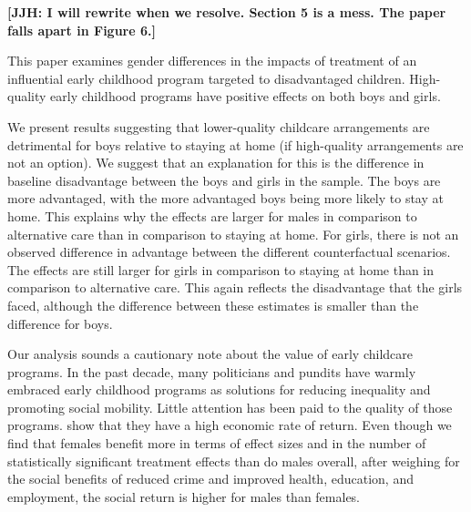 \textbf{[JJH: I will rewrite when we resolve. Section 5 is a mess. The paper falls apart in Figure 6.]}

This paper examines gender differences in the impacts of treatment of an influential early childhood program targeted to disadvantaged children. High-quality early childhood programs have positive effects on both boys and girls.

We present results suggesting that lower-quality childcare arrangements are detrimental for boys relative to staying at home (if high-quality arrangements are not an option). We suggest that an explanation for this is the difference in baseline disadvantage between the boys and girls in the sample. The boys are more advantaged, with the more advantaged boys being more likely to stay at home. This explains why the effects are larger for males in comparison to alternative care than in comparison to staying at home. For girls, there is not an observed difference in advantage between the different counterfactual scenarios. The effects are still larger for girls in comparison to staying at home than in comparison to alternative care. This again reflects the disadvantage that the girls faced, although the difference between these estimates is smaller than the difference for boys.

Our analysis sounds a cautionary note about the value of early childcare programs. In the past decade, many politicians and pundits have warmly embraced early childhood programs as solutions for reducing inequality and promoting social mobility. Little attention has been paid to the quality of those programs. \cite{Garcia_Heckman_Leaf_etal_2017_Comp_CBA_Unpublished} show that they have a high economic rate of return. Even though we find that females benefit more in terms of effect sizes and in the number of statistically significant treatment effects than do males overall, after weighing for the social benefits of reduced crime and improved health, education, and employment, the social return is higher for males than females.